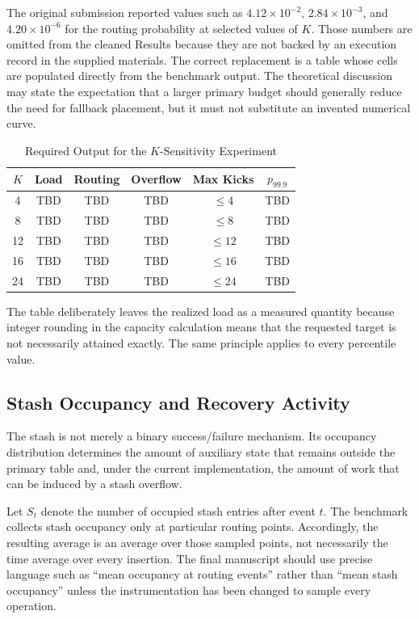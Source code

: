 \documentclass[conference]{IEEEtran}
\begin{document}
The original submission reported values such as $4.12\times10^{-2}$, $2.84\times10^{-3}$, and $4.20\times10^{-6}$ for the routing probability at selected values of $K$. Those numbers are omitted from the cleaned Results because they are not backed by an execution record in the supplied materials. The correct replacement is a table whose cells are populated directly from the benchmark output. The theoretical discussion may state the expectation that a larger primary budget should generally reduce the need for fallback placement, but it must not substitute an invented numerical curve.

\begin{table}[!t]
\caption{Required Output for the $K$-Sensitivity Experiment}
\label{tab:k-sensitivity-results}
\centering
\scriptsize
\setlength{\tabcolsep}{2.0pt}
\begin{tabular}{@{}c c c c c c@{}}
\toprule
$K$ & Load & Routing & Overflow & Max Kicks & $p_{99.9}$ \\
\midrule
4  & TBD & TBD & TBD & $\leq4$  & TBD \\
8  & TBD & TBD & TBD & $\leq8$  & TBD \\
12 & TBD & TBD & TBD & $\leq12$ & TBD \\
16 & TBD & TBD & TBD & $\leq16$ & TBD \\
24 & TBD & TBD & TBD & $\leq24$ & TBD \\
\bottomrule
\end{tabular}
\end{table}

The table deliberately leaves the realized load as a measured quantity because integer rounding in the capacity calculation means that the requested target is not necessarily attained exactly. The same principle applies to every percentile value.

\subsection{Stash Occupancy and Recovery Activity}
\label{subsec:stash_results}

The stash is not merely a binary success/failure mechanism. Its occupancy distribution determines the amount of auxiliary state that remains outside the primary table and, under the current implementation, the amount of work that can be induced by a stash overflow.

Let $S_t$ denote the number of occupied stash entries after event $t$. The benchmark collects stash occupancy only at particular routing points. Accordingly, the resulting average is an average over those sampled points, not necessarily the time average over every insertion. The final manuscript should use precise language such as ``mean occupancy at routing events'' rather than ``mean stash occupancy'' unless the instrumentation has been changed to sample every operation.
\end{document}
